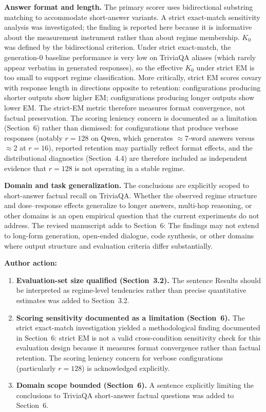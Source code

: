 \documentclass[11pt,a4paper]{article}
\newcommand{\newtext}[1]{#1}
\newcommand{\arhead}[1]{\medskip\noindent\textbf{#1}\par\smallskip}
\newcommand{\newtext}[1]{\textcolor{chgcolor}{``#1''}}
\begin{document}
\textbf{Answer format and length.}
The primary scorer uses bidirectional substring matching to accommodate
short-answer variants. A strict exact-match sensitivity analysis was
investigated; the finding is reported here because it is informative about
the measurement instrument rather than about regime membership. $K_0$
was defined by the bidirectional criterion. Under strict exact-match,
the generation-0 baseline performance is very low on TriviaQA aliases
(which rarely appear verbatim in generated responses), so the
effective $K_0$ under strict EM is too small to support regime
classification. More critically, strict EM scores covary with response
length in directions opposite to retention: configurations producing shorter
outputs show higher EM; configurations producing longer outputs show lower
EM. The strict-EM metric therefore measures format convergence, not
factual preservation. The scoring leniency concern is documented as a
limitation (Section~6) rather than dismissed: for configurations that
produce verbose responses (notably $r=128$ on Qwen, which generates
$\approx$7-word answers versus $\approx$2 at $r=16$), reported retention
may partially reflect format effects, and the distributional diagnostics
(Section~4.4) are therefore included as independent evidence that $r=128$
is not operating in a stable regime.

\textbf{Domain and task generalization.}
The conclusions are explicitly scoped to short-answer factual recall on
TriviaQA. Whether the observed regime structure and dose--response effects
generalize to longer answers, multi-hop reasoning, or other domains is an
open empirical question that the current experiments do not address.
The revised manuscript adds to Section~6: \newtext{The findings may not extend to long-form generation, open-ended dialogue, code synthesis, or other domains where output structure and evaluation criteria differ substantially.}

\arhead{Author action:}
\begin{enumerate}[leftmargin=1.4em,itemsep=0.3em]
\item \textbf{Evaluation-set size qualified (Section~3.2).}
      The sentence \newtext{Results should be interpreted as
      regime-level tendencies rather than precise quantitative
      estimates} was added to Section~3.2.
\item \textbf{Scoring sensitivity documented as a limitation (Section~6).}
      The strict exact-match investigation yielded a methodological finding
      documented in Section~6: strict EM is not a valid cross-condition
      sensitivity check for this evaluation design because it measures
      format convergence rather than factual retention.
      The scoring leniency concern for verbose configurations
      (particularly $r=128$) is acknowledged explicitly.
\item \textbf{Domain scope bounded (Section~6).}
      A sentence explicitly limiting the conclusions to TriviaQA
      short-answer factual questions was added to Section~6.
\end{enumerate}
\end{document}
